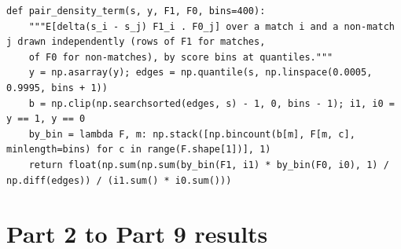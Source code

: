 \documentclass[11pt]{article}
\begin{document}
\begin{lstlisting}[caption={Density-weighted pair term (the mixing constant) (scripts/sim\_cv\_auc.py)}]
def pair_density_term(s, y, F1, F0, bins=400):
    """E[delta(s_i - s_j) F1_i . F0_j] over a match i and a non-match j drawn independently (rows of F1 for matches,
    of F0 for non-matches), by score bins at quantiles."""
    y = np.asarray(y); edges = np.quantile(s, np.linspace(0.0005, 0.9995, bins + 1))
    b = np.clip(np.searchsorted(edges, s) - 1, 0, bins - 1); i1, i0 = y == 1, y == 0
    by_bin = lambda F, m: np.stack([np.bincount(b[m], F[m, c], minlength=bins) for c in range(F.shape[1])], 1)
    return float(np.sum(np.sum(by_bin(F1, i1) * by_bin(F0, i0), 1) / np.diff(edges)) / (i1.sum() * i0.sum()))
\end{lstlisting}

\section{Part 2 to Part 9 results}
\end{document}
